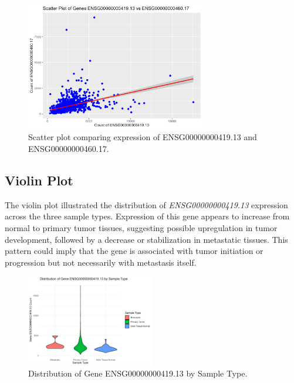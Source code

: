 \documentclass{article}
\begin{document}
\begin{figure}[H]
    \centering
    \includegraphics[width=0.7\textwidth]{final_project_scatter.png}
    \caption{Scatter plot comparing expression of ENSG00000000419.13 and ENSG00000000460.17.}
    \label{fig:scatter}
\end{figure}

\subsection{Violin Plot}
The violin plot illustrated the distribution of \textit{ENSG00000000419.13} expression across the three sample types. Expression of this gene appears to increase from normal to primary tumor tissues, suggesting possible upregulation in tumor development, followed by a decrease or stabilization in metastatic tissues. This pattern could imply that the gene is associated with tumor initiation or progression but not necessarily with metastasis itself.
\begin{figure}[h]
    \centering
    \includegraphics[width=0.5\textwidth]{final_project_violin.png}
    \caption{Distribution of Gene ENSG00000000419.13 by Sample Type.}
    \label{fig:violin}
\end{figure}
\end{document}

